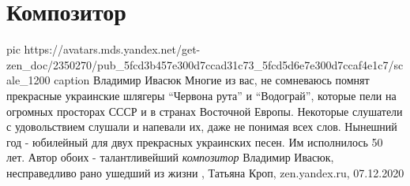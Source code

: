  
 
 
 
 
\chapter{Композитор}
\label{sec:slova.kompozitor}

\ifcmt
  pic https://avatars.mds.yandex.net/get-zen_doc/2350270/pub_5fcd3b457e300d7ccad31c73_5fcd5d6e7e300d7ccaf4e1c7/scale_1200
	caption Владимир Ивасюк
\fi
Многие из вас, не сомневаюсь помнят прекрасные украинские шлягеры \enquote{Червона
рута} и \enquote{Водограй}, которые пели на огромных просторах СССР и в странах
Восточной Европы. Некоторые слушатели с удовольствием слушали и напевали их,
даже не понимая всех слов.  Нынешний год - юбилейный для двух прекрасных
украинских песен. Им исполнилось 50 лет. Автор обоих - талантливейший
\emph{композитор} Владимир Ивасюк, несправедливо рано ушедший из жизни 
, 
Татьяна Кроп, zen.yandex.ru, 07.12.2020

